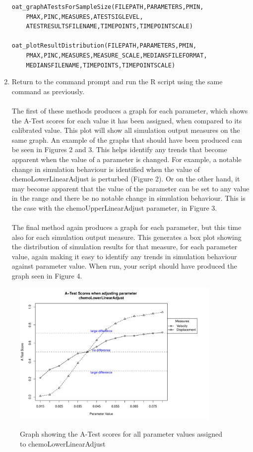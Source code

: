 \documentclass[a4paper,11pt]{article}
\begin{document}
\begin{enumerate}
\begin{verbatim}
oat_graphATestsForSampleSize(FILEPATH,PARAMETERS,PMIN,
	PMAX,PINC,MEASURES,ATESTSIGLEVEL,
	ATESTRESULTSFILENAME,TIMEPOINTS,TIMEPOINTSCALE)

oat_plotResultDistribution(FILEPATH,PARAMETERS,PMIN,
	PMAX,PINC,MEASURES,MEASURE_SCALE,MEDIANSFILEFORMAT,
	MEDIANSFILENAME,TIMEPOINTS,TIMEPOINTSCALE)
\end{verbatim}

\item Return to the command prompt and run the R script using the same command as previously.\\
\\
The first of these methods produces a graph for each parameter, which shows the A-Test scores for each value it has been assigned, when compared to its calibrated value. This plot will show all simulation output measures on the same graph. An example of the graphs that should have been produced can be seen in Figures 2 and 3.  This helps identify any trends that become apparent when the value of a parameter is changed. For example, a notable change in simulation behaviour is identified when the value of chemoLowerLinearAdjust is perturbed (Figure 2). Or on the other hand, it may become apparent that the value of the parameter can be set to any value in the range and there be no notable change in simulation behaviour. This is the case with the chemoUpperLinearAdjust parameter, in Figure 3.\\
\\
The final method again produces a graph for each parameter, but this time also for each simulation output measure. This generates a box plot showing the distribution of simulation results for that measure, for each parameter value, again making it easy to identify any trends in simulation behaviour against parameter value. When run, your script should have produced the graph seen in Figure 4.

\end{enumerate}
\newpage 
\begin{figure}[h!]
\centering
    \includegraphics[width=0.9\textwidth]{OAT_chemoLowerLinearAdjust.pdf}\\ \noindent
    \caption{Graph showing the A-Test scores for all parameter values assigned to chemoLowerLinearAdjust}
    \label{OAT_Results1}
    \end{figure}
\end{document}
